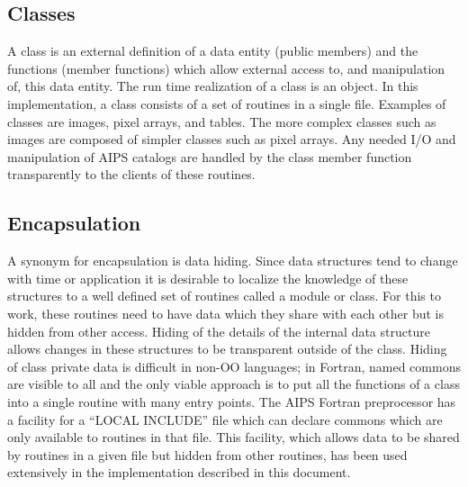 \subsection{Classes}
   A class is an external definition of a data entity (public members)
and the functions (member functions) which allow external access to,
and manipulation of, this data entity.  The run time realization of a
class is an object.  In this implementation, a class consists of a set
of routines in a single file.  Examples of classes are images, pixel
arrays, and tables.  The more complex classes such as images are
composed of simpler classes such as pixel arrays.  Any needed I/O and
manipulation of AIPS catalogs are handled by the class member function
transparently to the clients of these routines.

\subsection{Encapsulation}
   A synonym for encapsulation is data hiding.  Since data structures
tend to change with time or application it is desirable to localize
the knowledge of these structures to a well defined set of routines
called a module or class.  For this to work, these routines need to
have data which they share with each other but is hidden from other
access.  Hiding of the details of the internal data structure allows
changes in these structures to be transparent outside of the class.
   Hiding of class private data is difficult in non-OO languages;
in Fortran, named commons are visible to all and the only viable
approach is to put all the functions of a class into a single routine
with many entry points.  The AIPS Fortran preprocessor has a facility
for a ``LOCAL INCLUDE'' file which can declare commons which are only
available to routines in that file.  This facility, which allows data
to be shared by routines in a given file but hidden from other
routines, has been used extensively in the implementation described in
this document.

